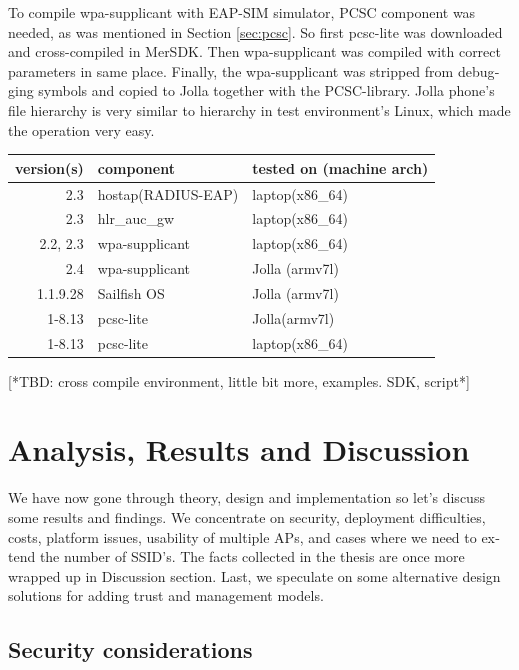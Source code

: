 \documentclass[12pt,a4paper,english]{tutthesis}
\begin{document}
\begin{otherlanguage}{english}
To compile wpa-supplicant with EAP-SIM simulator, PCSC component was
needed, as was mentioned in Section \ref{sec:pcsc}. So first pcsc-lite was
downloaded and cross-compiled in MerSDK. Then wpa-supplicant was compiled
with correct parameters in same place. Finally, the wpa-supplicant was 
stripped from debugging symbols and copied to Jolla together with the PCSC-library.
Jolla phone's file hierarchy is very similar to hierarchy in test
environment's Linux, which made the operation very easy.



\begin{center}
\begin{tabular}{rll}
version(s) & component & tested on (machine arch)\\
\hline
2.3 & hostap(RADIUS-EAP) & laptop(x86\_64)\\
2.3 & hlr\_auc\_gw & laptop(x86\_64)\\
2.2, 2.3 & wpa-supplicant & laptop(x86\_64)\\
2.4 & wpa-supplicant & Jolla (armv7l)\\
1.1.9.28 & Sailfish OS & Jolla (armv7l)\\
1-8.13 & pcsc-lite & Jolla(armv7l)\\
1-8.13 & pcsc-lite & laptop(x86\_64)\\
\hline
\end{tabular}
\end{center}

[*TBD: cross compile environment, little bit more, examples. SDK,
script*]


\chapter{Analysis, Results and Discussion}
\label{sec-6}

We have now gone through theory, design and implementation so let's
discuss some results and findings. We concentrate on security, 
deployment difficulties, costs, platform issues, usability of multiple
APs, and cases where we
need to extend the number of SSID's. The facts collected in the thesis
are once more wrapped up in Discussion section.
Last, we speculate on some alternative design solutions for adding
trust and management models.


\section{Security considerations}
\label{sec-6-1}




\end{otherlanguage}
\end{document}
